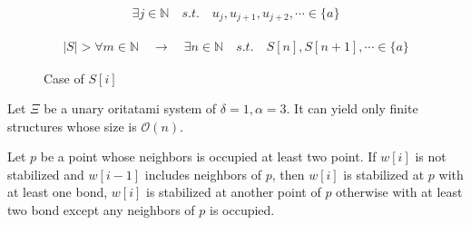 \begin{eqnarray}
  \exists j \in \mathbb{N} \quad s.t. \quad u_j , u_{j+1} , u_{j+2} , \cdots \in \{ a \}
  \label{TTT_only_a}
\end{eqnarray}

\begin{eqnarray}
  | S | > \forall m \in \mathbb{N} \quad \to \quad \exists n \in \mathbb{N} \quad s.t. \quad S[n], S[n+1], \cdots \in \{ a \}
  \label{TTT_structure}
\end{eqnarray}

\begin{figure}
  \begin{center}
    \caption{Case of $S[i]$}
    \label{TTT_case_of_o}
  \end{center}
\end{figure}

\begin{theorem}[$\delta = 1, \alpha = 3$]
Let $\Xi$ be a unary oritatami system of $\delta = 1, \alpha = 3$. It can yield only finite structures whose size is $\mathcal{O}(n)$.
\end{theorem}

\begin{lemma}
\label{TTT_a3_2b_lemma}
 Let $p$ be a point whose neighbors is occupied at least two point. If $w[i]$ is not stabilized and $w[i-1]$ includes neighbors of $p$, then $w[i]$ is stabilized at $p$ with at least one bond, $w[i]$ is stabilized at another point of $p$ otherwise with at least two bond except any neighbors of $p$ is occupied.
\end{lemma}


